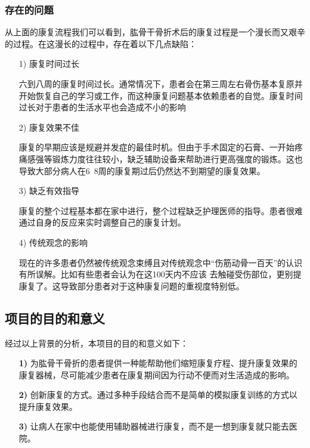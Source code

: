 \documentclass[UTF8]{ctexart}
\begin{document}
        \subsubsection{存在的问题}
            从上面的康复流程我们可以看到，肱骨干骨折术后的康复过程是一个漫长而又艰辛的过程。在这漫长的过程中，存在着以下几点缺陷：
            \begin{enumerate}
                \item[1)]康复时间过长 
                
                    六到八周的康复时间过长。通常情况下，患者会在第三周左右骨伤基本复原并开始恢复自己的学习或工作，而这种康复问题基本依赖患者的自觉。康复时间过长对于患者的生活水平也会造成不小的影响
                
                \item [2)]康复效果不佳
                    
                    康复的早期应该是规避并发症的最佳时机。但由于手术固定的石膏、一开始疼痛感强等锻炼力度往往较小，缺乏辅助设备来帮助进行更高强度的锻炼。这也导致大部分病人在6~8周的康复期过后仍然达不到期望的康复效果。

                \item [3)]缺乏有效指导
                
                    康复的整个过程基本都在家中进行，整个过程缺乏护理医师的指导。患者很难通过自身的反应来实时调整自己的康复计划。
            
                \item [4)]传统观念的影响
                
                    现在的许多患者仍然被传统观念束缚且对传统观念中“伤筋动骨一百天”的认识有所误解。比如有些患者会认为在这100天内不应该 去触碰受伤部位，更别提康复了。这导致部分患者对于这种康复问题的重视度特别低。
            \end{enumerate}

    \subsection{项目的目的和意义}
        经过以上背景的分析，本项目的目的和意义如下：
            \begin{enumerate}
                \item [\textbf{1)}]为肱骨干骨折的患者提供一种能帮助他们缩短康复疗程、提升康复效果的康复器械，尽可能减少患者在康复期间因为行动不便而对生活造成的影响。
                \item [\textbf{2)}]创新康复的方式。通过多种手段结合而不是简单的模拟康复训练的方式以提升康复效果。
                \item [\textbf{3)}]让病人在家中也能使用辅助器械进行康复，而不是一想到康复就只能去医院。
            \end{enumerate}
\newpage
\end{document}
